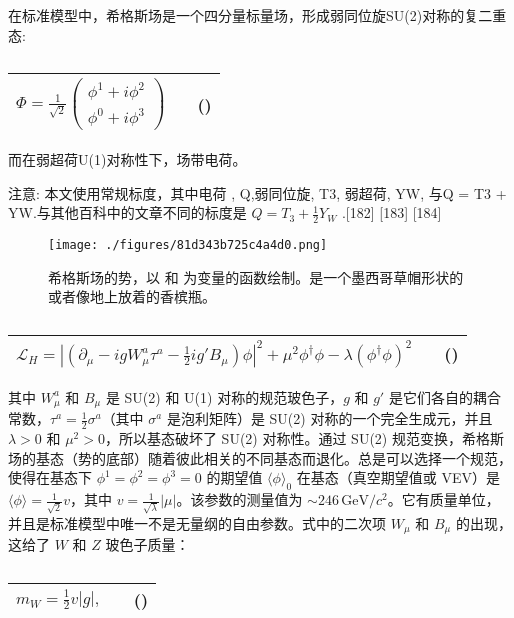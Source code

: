 在标准模型中，希格斯场是一个四分量标量场，形成弱同位旋SU(2)对称的复二重态:
\begin{table}[h]
\centering
\caption\label{tab_Higgs_2}
\begin{tabular}{|c|c|c|}
\hline
$\Phi = \frac{1}{\sqrt{2}} \left( \begin{array}{c}\phi^1 + i\phi^2 \\\phi^0 + i\phi^3\end{array} \right)$ & & () \\
\hline
\end{tabular}
\end{table}

而在弱超荷U(1)对称性下，场带电荷。

注意: 本文使用常规标度，其中电荷 , Q,弱同位旋, T3, 弱超荷, YW, 与Q = T3 + YW.与其他百科中的文章不同的标度是 $Q = T_3 + \frac{1}{2} Y_W$ .[182] [183] [184]

\begin{figure}[ht]
\centering
\texttt{[image: ./figures/81d343b725c4a4d0.png]}
\caption{希格斯场的势，以 和 为变量的函数绘制。是一个墨西哥草帽形状的或者像地上放着的香槟瓶。} \label{fig_Higgs_18}
\end{figure}

\begin{table}[h]
\centering
\caption\label{tab_Higgs_3}
\begin{tabular}{|c|c|c|}
\hline
$\mathcal{L}_H = \left| \left( \partial_\mu - ig W_\mu^a \tau^a - \frac{1}{2} ig' B_\mu \right) \phi \right|^2 + \mu^2 \phi^\dagger \phi - \lambda (\phi^\dagger \phi)^2$ & & () \\
\hline
\end{tabular}
\end{table}

其中 $W_\mu^a$ 和 $B_\mu$ 是 SU(2) 和 U(1) 对称的规范玻色子，$g$ 和 $g'$ 是它们各自的耦合常数，$\tau^a = \frac{1}{2} \sigma^a$（其中 $\sigma^a$ 是泡利矩阵）是 SU(2) 对称的一个完全生成元，并且 $\lambda > 0$ 和 $\mu^2 > 0$，所以基态破坏了 SU(2) 对称性。通过 SU(2) 规范变换，希格斯场的基态（势的底部）随着彼此相关的不同基态而退化。总是可以选择一个规范，使得在基态下 $\phi^1 = \phi^2 = \phi^3 = 0$ 的期望值 $\langle \phi \rangle_0$ 在基态（真空期望值或 VEV）是 $\langle \phi \rangle = \frac{1}{\sqrt{2}} v$，其中 $v = \frac{1}{\sqrt{\lambda}}|\mu|$。该参数的测量值为 $\sim 246 \, \text{GeV}/c^2$。它有质量单位，并且是标准模型中唯一不是无量纲的自由参数。式中的二次项 $W_\mu$ 和 $B_\mu$ 的出现，这给了 $W$ 和 $Z$ 玻色子质量：

\begin{table}[h]
\centering
\caption\label{tab_Higgs_4}
\begin{tabular}{|c|c|c|}
\hline
$m_W = \frac{1}{2} v \left| g \right|,$ & & () \\
\hline
\end{tabular}
\end{table}

